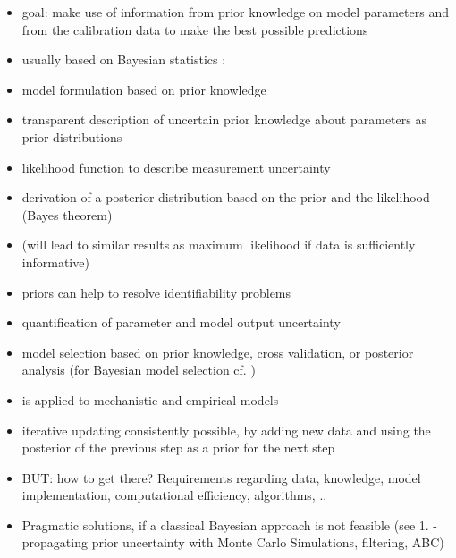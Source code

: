 \documentclass [english,11pt]{article} %
\begin{document}
\begin{itemize}
\item goal: make use of information from prior knowledge on model parameters and from the calibration data to make the best possible predictions
\item usually based on Bayesian statistics \citep{Gelman2014}: 
\item model formulation based on prior knowledge 
\item transparent description of uncertain prior knowledge about parameters as \glspl{prior distribution} 
\item likelihood function to describe measurement uncertainty 
\item derivation of a posterior distribution based on the prior and the likelihood (Bayes theorem)

\item (will lead to similar results as maximum likelihood if data is sufficiently informative)
\item priors can help to resolve identifiability problems 
\item quantification of parameter and model output uncertainty
\item model selection based on prior knowledge, \gls{cross validation}, or posterior analysis (for Bayesian model selection cf. \cite{Hooten2015})
\item is applied to mechanistic and empirical models
\item iterative updating consistently possible, by adding new data and using the posterior of the previous step as a prior for the next step

\item BUT: how to get there? Requirements regarding data, knowledge, model implementation, computational efficiency, algorithms, .. 
\item Pragmatic solutions, if a classical Bayesian approach is not feasible (see 1. - propagating prior uncertainty with Monte Carlo Simulations, filtering, ABC) 

\noindent
\end{itemize}
\end{document}
